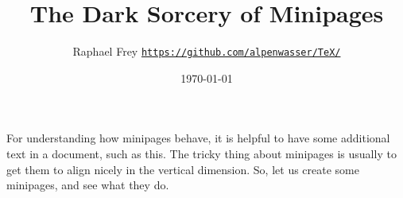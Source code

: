 \documentclass{article}
\title{The Dark Sorcery of Minipages}
\author{Raphael Frey\quad
\href{https://github.com/alpenwasser/TeX/tree/master/minipages}
     {\nolinkurl{https://github.com/alpenwasser/TeX/}}}
\date{\today}
\begin{document}

\maketitle


For understanding how minipages behave, it  is helpful to have some additional
text in a document, such as  this. The tricky thing about minipages is usually
to get them to align nicely in  the vertical dimension. So, let us create some
minipages, and see what they do.
\end{document}
